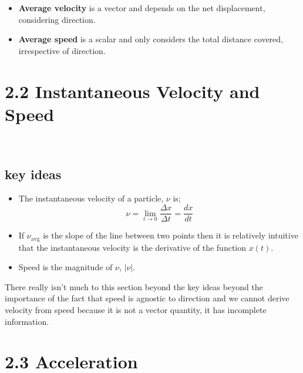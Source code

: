 \documentclass{article}
\begin{document}
\begin{itemize}
    \item \textbf{Average velocity} is a vector and depends on the net displacement, considering direction.
    \item \textbf{Average speed} is a scalar and only considers the total distance covered, irrespective of direction.
\end{itemize}

\section*{2.2 Instantaneous Velocity and Speed}\
\subsection*{key ideas}
\begin{itemize}
	\item The instantaneous velocity of a particle, $\nu$ is;
		\[
			\nu = \lim_{t \to 0} \frac{\Delta x}{\Delta t} = \frac{dx}{dt}
		\]
	\item If $\nu_{\text{avg}}$ is the slope of the line between two points then it is relatively intuitive that the instantaneous velocity is the derivative of the function $x(t)$.
	\item Speed is the magnitude of $\nu$, $|\nu|$.
\end{itemize}

There really isn't much to this section beyond the key ideas beyond the importance of the fact that speed is agnostic to direction and we cannot derive velocity from speed because it is not a vector quantity, it has incomplete information.

\section*{2.3 Acceleration}
\end{document}
